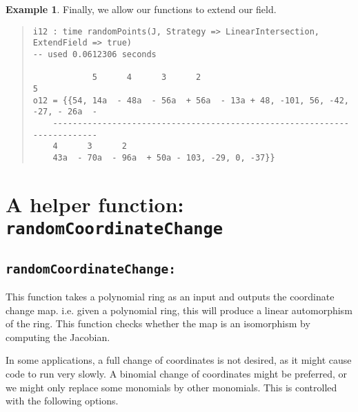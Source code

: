 \documentclass[11pt]{amsart}
\theoremstyle{definition}
\newtheorem{example}{Example}[section]
\begin{document}
    \begin{example}
        Finally, we allow our functions to extend our field.
        {{\small\color{blue}
        \begin{quote}
        \begin{verbatim}
i12 : time randomPoints(J, Strategy => LinearIntersection, ExtendField => true)
-- used 0.0612306 seconds

            5      4      3      2                                      5  
o12 = {{54, 14a  - 48a  - 56a  + 56a  - 13a + 48, -101, 56, -42, -27, - 26a  -
    -------------------------------------------------------------------------
    4      3      2
    43a  - 70a  - 96a  + 50a - 103, -29, 0, -37}}
        \end{verbatim}
    \end{quote}
        }}
    \end{example}

\section{A helper function: {\tt randomCoordinateChange}}{\label{helper}}


\subsection*{\tt randomCoordinateChange:} 

This function takes a polynomial ring as an input and outputs the coordinate change map.  
i.e. given a polynomial ring, this will produce a linear automorphism of the ring.  This function checks whether the map is an isomorphism by computing the Jacobian.

In some applications, a full change of coordinates is not desired, as it might cause code to run very slowly.  A binomial change of coordinates might be preferred, or we might only replace some monomials by other monomials.  
This is controlled with the following options.
\end{document}
